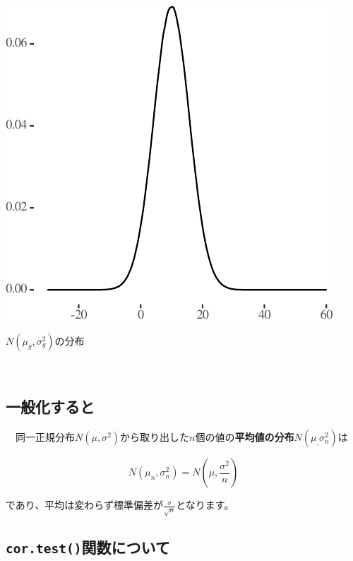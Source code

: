\documentclass[]{tufte-handout}
\begin{document}
\begin{marginfigure}

{\centering \includegraphics{AdditivityOfVariance_files/figure-latex/unnamed-chunk-14-1} 

}

\caption[$N(\mu_g, \sigma^2_g)$の分布]{$N(\mu_g, \sigma^2_g)$の分布}\label{fig:unnamed-chunk-14}
\end{marginfigure}

　

\hypertarget{ux4e00ux822cux5316ux3059ux308bux3068}{%
\subsection{\texorpdfstring{\textbf{一般化すると}}{一般化すると}}\label{ux4e00ux822cux5316ux3059ux308bux3068}}

　同一正規分布\(N(\mu, \sigma^2)\)から取り出した\(n\)個の値の\textbf{平均値の分布}\(N(\mu_, \sigma^2_n)\)は

\[N(\mu_n, \sigma^2_n) = N(\mu, \frac{\sigma^2}{n})\]

であり、平均は変わらず標準偏差が\(\frac{\sigma}{\sqrt{n}}\)となります。

\newpage

\hypertarget{cor.testux95a2ux6570ux306bux3064ux3044ux3066}{%
\subsection{\texorpdfstring{\texttt{cor.test()}関数について}{cor.test()関数について}}\label{cor.testux95a2ux6570ux306bux3064ux3044ux3066}}
\end{document}
